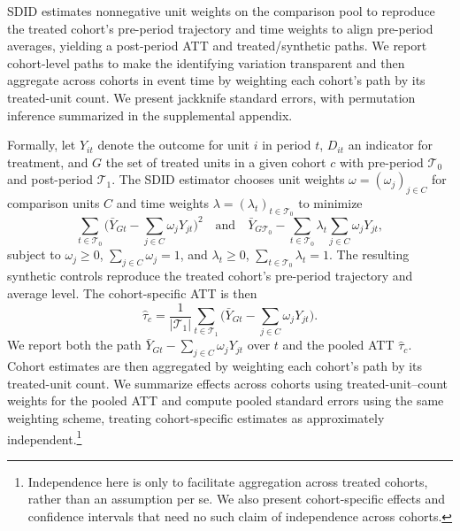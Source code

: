 \documentclass[a4paper, 12pt, twoside]{article}
\begin{document}
SDID estimates nonnegative unit weights on the comparison pool to reproduce the treated cohort’s pre-period trajectory and time weights to align pre-period averages, yielding a post-period ATT and treated/synthetic paths. We report cohort-level paths to make the identifying variation transparent and then aggregate across cohorts in event time by weighting each cohort’s path by its treated-unit count. We present jackknife standard errors, with permutation inference summarized in the supplemental appendix.

Formally, let $Y_{it}$ denote the outcome for unit $i$ in period $t$, $D_{it}$ an indicator for treatment, and $G$ the set of treated units in a given cohort $c$ with pre-period $\mathcal{T}_0$ and post-period $\mathcal{T}_1$. The SDID estimator chooses unit weights $\omega=(\omega_j)_{j\in C}$ for comparison units $C$ and time weights $\lambda=(\lambda_t)_{t\in\mathcal{T}_0}$ to minimize
\begin{equation*}
\sum_{t\in\mathcal{T}_0}\Big( \bar Y_{Gt} - \sum_{j\in C}\omega_j Y_{jt}\Big)^2 
\quad \text{and} \quad
\bar Y_{G\mathcal{T}_0} - \sum_{t\in \mathcal{T}_0}\lambda_t\sum_{j\in C}\omega_j Y_{jt},
\end{equation*}
subject to $\omega_j\ge 0$, $\sum_{j\in C}\omega_j=1$, and $\lambda_t\ge 0$, $\sum_{t\in \mathcal{T}_0}\lambda_t=1$. The resulting synthetic controls reproduce the treated cohort’s pre-period trajectory and average level. The cohort-specific ATT is then
\begin{equation*}
\widehat{\tau}_c = \frac{1}{|\mathcal{T}_1|}\sum_{t\in \mathcal{T}_1}\Big(\bar Y_{Gt} - \sum_{j\in C}\omega_j Y_{jt}\Big).
\end{equation*}
We report both the path $\bar Y_{Gt}-\sum_{j\in C}\omega_j Y_{jt}$ over $t$ and the pooled ATT $\widehat\tau_c$. Cohort estimates are then aggregated by weighting each cohort’s path by its treated-unit count. We summarize effects across cohorts using treated-unit--count weights for the pooled ATT and compute pooled standard errors using the same weighting scheme, treating cohort-specific estimates as approximately independent.\footnote{Independence here is only to facilitate aggregation across treated cohorts, rather than an assumption per se. We also present cohort-specific effects and confidence intervals that need no such claim of independence across cohorts.}
\end{document}
